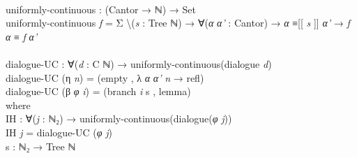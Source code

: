 \documentclass{entcs} \usepackage{prentcsmacro}
\newcommand{\AgdaFontStyle}[1]{\textsf{#1}}
\newcommand{\AgdaBoundFontStyle}[1]{\textit{#1}}
\newcommand{\AgdaKeyword}     [1]
    {\AgdaFontStyle{\textcolor{AgdaKeyword}{#1}}}
\newcommand{\AgdaSymbol}      [1]{\textcolor{AgdaSymbol}{#1}}
\newcommand{\AgdaPrimitiveType}[1]
    {\AgdaFontStyle{\textcolor{AgdaPrimitiveType}{#1}}}
\newcommand{\AgdaBound}    [1]{\AgdaBoundFontStyle{\textcolor{AgdaBound}{#1}}}
\newcommand{\AgdaInductiveConstructor}[1]
    {\AgdaFontStyle{\textcolor{AgdaInductiveConstructor}{#1}}}
\newcommand{\AgdaDatatype} [1]{\AgdaFontStyle{\textcolor{AgdaDatatype}{#1}}}
\newcommand{\AgdaFunction} [1]{\AgdaFontStyle{\textcolor{AgdaFunction}{#1}}}
\newcommand{\AgdaIndent}[1]{\quad}
\newcommand{\AgdaCodeStyle}{\small}
\newenvironment{code}%
{\noindent\AgdaCodeStyle\pboxed}%
{\endpboxed\par\noindent%
\ignorespacesafterend}
\begin{document}
\begin{code}\>\<%
\\
\>\AgdaFunction{uniformly-continuous} \AgdaSymbol{:} \AgdaSymbol{(}\AgdaFunction{Cantor} \AgdaSymbol{→} \AgdaDatatype{ℕ}\AgdaSymbol{)} \AgdaSymbol{→} \AgdaPrimitiveType{Set}\<%
\\
\>\AgdaFunction{uniformly-continuous} \AgdaBound{f} \AgdaSymbol{=} \AgdaDatatype{Σ} \AgdaSymbol{	\textbackslash(}\AgdaBound{s} \AgdaSymbol{:} \AgdaDatatype{Tree} \AgdaDatatype{ℕ}\AgdaSymbol{)} \AgdaSymbol{→} \AgdaSymbol{∀(}\AgdaBound{α} \AgdaBound{α'} \AgdaSymbol{:} \AgdaFunction{Cantor}\AgdaSymbol{)} \AgdaSymbol{→} \AgdaBound{α} \AgdaDatatype{≡[[} \AgdaBound{s} \AgdaDatatype{]]} \AgdaBound{α'} \AgdaSymbol{→} \AgdaBound{f} \AgdaBound{α} \AgdaDatatype{≡} \AgdaBound{f} \AgdaBound{α'}\<%
\\
%
\\
\>\AgdaFunction{dialogue-UC} \AgdaSymbol{:} \AgdaSymbol{∀(}\AgdaBound{d} \AgdaSymbol{:} \AgdaFunction{C} \AgdaDatatype{ℕ}\AgdaSymbol{)} \AgdaSymbol{→} \AgdaFunction{uniformly-continuous}\AgdaSymbol{(}\AgdaFunction{dialogue} \AgdaBound{d}\AgdaSymbol{)}\<%
\\
\>\AgdaFunction{dialogue-UC} \AgdaSymbol{(}\AgdaInductiveConstructor{η} \AgdaBound{n}\AgdaSymbol{)} \AgdaSymbol{=} \AgdaSymbol{(}\AgdaInductiveConstructor{empty} \AgdaInductiveConstructor{,} \AgdaSymbol{λ} \AgdaBound{α} \AgdaBound{α'} \AgdaBound{n} \AgdaSymbol{→} \AgdaInductiveConstructor{refl}\AgdaSymbol{)}\<%
\\
\>\AgdaFunction{dialogue-UC} \AgdaSymbol{(}\AgdaInductiveConstructor{β} \AgdaBound{φ} \AgdaBound{i}\AgdaSymbol{)} \AgdaSymbol{=} \AgdaSymbol{(}\AgdaInductiveConstructor{branch} \AgdaBound{i} \AgdaFunction{s} \AgdaInductiveConstructor{,} \AgdaFunction{lemma}\AgdaSymbol{)}\<%
\\
\>[0]\AgdaIndent{2}{}\<[2]%
\>[2]\AgdaKeyword{where}\<%
\\
\>[0]\AgdaIndent{4}{}\<[4]%
\>[4]\AgdaFunction{IH} \AgdaSymbol{:} \AgdaSymbol{∀(}\AgdaBound{j} \AgdaSymbol{:} \AgdaDatatype{ℕ₂}\AgdaSymbol{)} \AgdaSymbol{→} \AgdaFunction{uniformly-continuous}\AgdaSymbol{(}\AgdaFunction{dialogue}\AgdaSymbol{(}\AgdaBound{φ} \AgdaBound{j}\AgdaSymbol{))}\<%
\\
\>[0]\AgdaIndent{4}{}\<[4]%
\>[4]\AgdaFunction{IH} \AgdaBound{j} \AgdaSymbol{=} \AgdaFunction{dialogue-UC} \AgdaSymbol{(}\AgdaBound{φ} \AgdaBound{j}\AgdaSymbol{)}\<%
\\
\>[0]\AgdaIndent{4}{}\<[4]%
\>[4]\AgdaFunction{s} \AgdaSymbol{:} \AgdaDatatype{ℕ₂} \AgdaSymbol{→} \AgdaDatatype{Tree} \AgdaDatatype{ℕ}\<%

\end{code}
\end{document}
